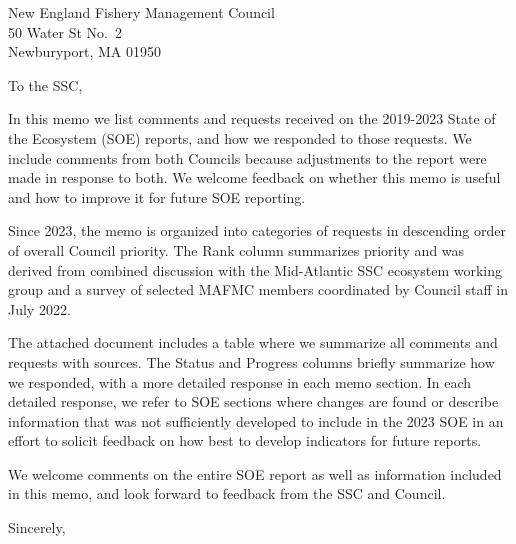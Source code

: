 \documentclass[11pt,]{letter}
\date{13 March, 2025}
\begin{document}
\begin{letter}{New England Fishery Management Council\\50 Water St
No.~2\\Newburyport, MA 01950}
\opening{To the SSC,}

In this memo we list comments and requests received on the 2019-2023
State of the Ecosystem (SOE) reports, and how we responded to those
requests. We include comments from both Councils because adjustments to
the report were made in response to both. We welcome feedback on whether
this memo is useful and how to improve it for future SOE reporting.

Since 2023, the memo is organized into categories of requests in
descending order of overall Council priority. The Rank column summarizes
priority and was derived from combined discussion with the Mid-Atlantic
SSC ecosystem working group and a survey of selected MAFMC members
coordinated by Council staff in July 2022.

The attached document includes a table where we summarize all comments
and requests with sources. The Status and Progress columns briefly
summarize how we responded, with a more detailed response in each memo
section. In each detailed response, we refer to SOE sections where
changes are found or describe information that was not sufficiently
developed to include in the 2023 SOE in an effort to solicit feedback on
how best to develop indicators for future reports.

We welcome comments on the entire SOE report as well as information
included in this memo, and look forward to feedback from the SSC and
Council.

\longindentation=0pt
\closing{Sincerely,}

\end{letter}
\end{document}
